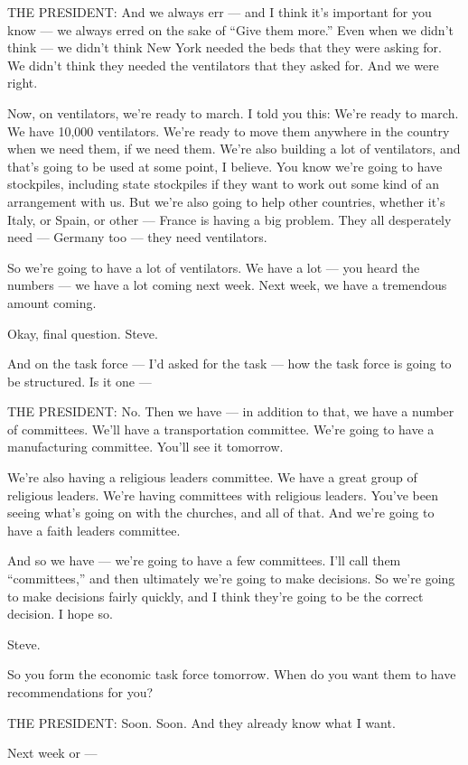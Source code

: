THE PRESIDENT: And we always err --- and I think it's important for you
know --- we always erred on the sake of ``Give them more.'' Even when we
didn't think --- we didn't think New York needed the beds that they were
asking for. We didn't think they needed the ventilators that they asked
for. And we were right.

Now, on ventilators, we're ready to march. I told you this: We're ready
to march. We have 10,000 ventilators. We're ready to move them anywhere
in the country when we need them, if we need them. We're also building a
lot of ventilators, and that's going to be used at some point, I
believe. You know we're going to have stockpiles, including state
stockpiles if they want to work out some kind of an arrangement with us.
But we're also going to help other countries, whether it's Italy, or
Spain, or other --- France is having a big problem. They all desperately
need --- Germany too --- they need ventilators.

So we're going to have a lot of ventilators. We have a lot --- you heard
the numbers --- we have a lot coming next week. Next week, we have a
tremendous amount coming.

Okay, final question. Steve.

And on the task force --- I'd asked for the task --- how the task force
is going to be structured. Is it one ---

THE PRESIDENT: No. Then we have --- in addition to that, we have a
number of committees. We'll have a transportation committee. We're going
to have a manufacturing committee. You'll see it tomorrow.

We're also having a religious leaders committee. We have a great group
of religious leaders. We're having committees with religious leaders.
You've been seeing what's going on with the churches, and all of that.
And we're going to have a faith leaders committee.

And so we have --- we're going to have a few committees. I'll call them
``committees,'' and then ultimately we're going to make decisions. So
we're going to make decisions fairly quickly, and I think they're going
to be the correct decision. I hope so.

Steve.

So you form the economic task force tomorrow. When do you want them to
have recommendations for you?

THE PRESIDENT: Soon. Soon. And they already know what I want.

Next week or ---

